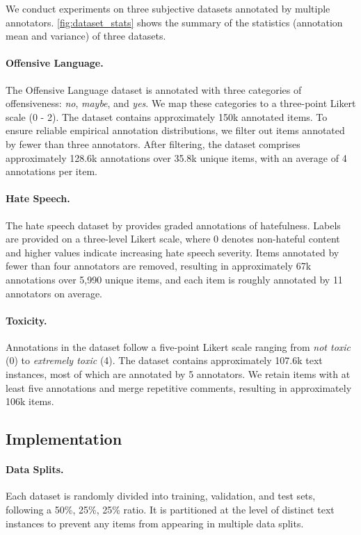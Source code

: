 \documentclass{article} %
\begin{document}
We conduct experiments on three subjective datasets annotated by multiple annotators. \cref{fig:dataset_stats} shows the summary of the statistics (annotation mean and variance) of three datasets.

\paragraph{Offensive Language.}
The Offensive Language dataset \citep{sap-etal-2020-social} is annotated with three categories of offensiveness: \textit{no}, \textit{maybe}, and \textit{yes}.
We map these categories to a three-point Likert scale (0 - 2). The dataset contains approximately 150k annotated items.
To ensure reliable empirical annotation distributions, we filter out items annotated by fewer than three annotators.
After filtering, the dataset comprises approximately 128.6k annotations over 35.8k unique items, with an average of {4 annotations per item}.


\paragraph{Hate Speech.} 
The hate speech dataset by \citet{kennedy2020constructing} provides graded annotations of hatefulness. Labels are provided on a three-level Likert scale, where 0 denotes non-hateful content and higher values indicate increasing hate speech severity.
Items annotated by fewer than four annotators are removed, resulting in approximately 67k annotations over 5,990 unique items, and each item is roughly annotated by {11 annotators} on average.

\paragraph{Toxicity.} Annotations in the dataset \citep{kumar2021designing} follow a five-point Likert scale ranging from \textit{not toxic} (0) to \textit{extremely toxic} (4). 
The dataset contains approximately 107.6k text instances, most of which are annotated by {5 annotators}.
We retain items with at least five annotations and merge repetitive comments, resulting in approximately 106k items.

\subsection{Implementation}
\vspace{10pt}

\paragraph{Data Splits.} Each dataset is randomly divided into training, validation, and test sets, following a 50\%, 25\%, 25\% ratio. It is partitioned at the level of distinct text instances to prevent any items from appearing in multiple data splits. 
\end{document}
